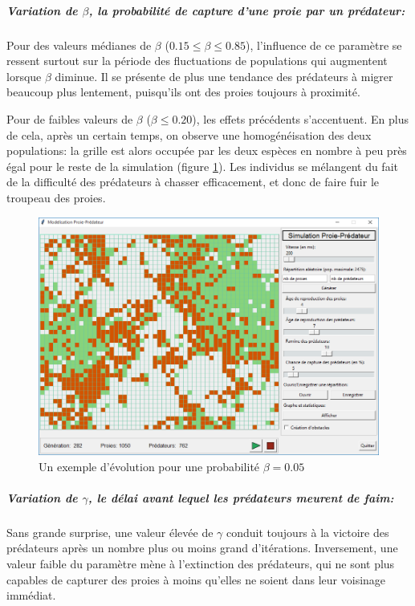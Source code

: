 \documentclass[11pt]{article}
\begin{document}
\subparagraph{Variation de $\beta$, la probabilité de capture d'une proie par un prédateur:}

Pour des valeurs médianes de $\beta$ ($0.15 \leq \beta \leq 0.85$), l'influence de ce paramètre se ressent surtout sur la période des fluctuations de populations qui augmentent lorsque $\beta$ diminue. Il se présente de plus une tendance des prédateurs à migrer beaucoup plus lentement, puisqu'ils ont des proies toujours à proximité.

Pour de faibles valeurs de $\beta$ ($\beta \leq 0.20$), les effets précédents s'accentuent. En plus de cela, après un certain temps, on observe une homogénéisation des deux populations: la grille est alors occupée par les deux espèces en nombre à peu près égal pour le reste de la simulation (figure \ref{fig:faible_proba}).
Les individus se mélangent du fait de la difficulté des prédateurs à chasser efficacement, et donc de faire fuir le troupeau des proies.

\begin{figure}[!ht]
    \centering
    \includegraphics[width=12cm]{faible_proba.png}
    \caption{Un exemple d'évolution pour une probabilité $\beta = 0.05$}
    \label{fig:faible_proba}
\end{figure}


\subparagraph{Variation de $\gamma$, le délai avant lequel les prédateurs meurent de faim:}

Sans grande surprise, une valeur élevée de $\gamma$ conduit toujours à la victoire des prédateurs après un nombre plus ou moins grand d'itérations. Inversement, une valeur faible du paramètre mène à l'extinction des prédateurs, qui ne sont plus capables de capturer des proies à moins qu'elles ne soient dans leur voisinage immédiat.
\end{document}
